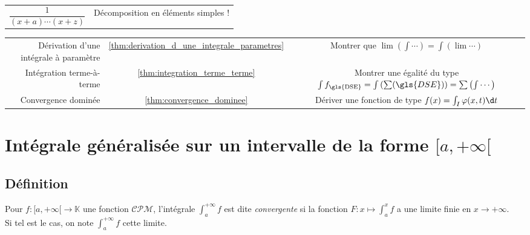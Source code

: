 \documentclass[11pt,a4paper,fleqn,pdftex]{report}
\begin{document}
\begin{methode}
\begin{tabulary}{\textwidth}{| c | C |}
     $\dfrac{1}{(x+a)\cdots(x+z)}$&Décomposition en éléments simples !\\
\end{tabulary}
\begin{tabulary}{\textwidth}{| r@{ - (} c @{) }| C |}
     \small{Dérivation d'une intégrale à paramètre}&\ref{thm:derivation_d_une_integrale_parametres}&Montrer que $\lim\left( \int \cdots\right) = \int \left( \lim \cdots\right) $\\
     \small{Intégration terme-à-terme}&\ref{thm:integration_terme_terme}&Montrer une égalité du type $\int f_\text{\gls{DSE}} = \int \left( \sum (\gls{DSE}) \right) = \sum \left( \int \cdots \right)$\\
     Convergence dominée&\ref{thm:convergence_dominee}&Dériver une fonction de type $f(x)=\int_I \varphi(x,t)\d t$
\end{tabulary}
\end{methode}
\section{Intégrale généralisée sur un intervalle de la forme $[a,+\infty[$} %
\label{sec:integrale_generalisee}
\subsection{Définition} %
\label{sub:definition}
\begin{dfn}
    \label{dfn:integrale_convergente}
     Pour $f : [a,+\infty[ \to \mathbb{K}$ une fonction $\mathcal{CPM}$, l'intégrale $\int_a^{+\infty} f$ est dite \emph{convergente} si la fonction $F : x \mapsto \int_a^x f$ a une limite finie en $x\to +\infty$.\\
     Si tel est le cas, on note $\int_a^{+\infty} f$ cette limite.
\end{dfn}
\end{document}
